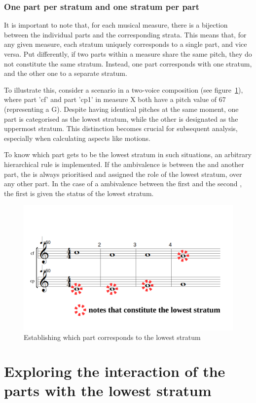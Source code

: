 \subsubsection{One part per stratum and one stratum per part} \label{subsubsection:one-part-per-stratum}
It is important to note that, for each musical measure, there is a bijection between the individual parts and the corresponding strata. This means that, for any given measure, each stratum uniquely corresponds to a single part, and vice versa. Put differently, if two parts within a measure share the same pitch, they do not constitute the same stratum. Instead, one part corresponds with one stratum, and the other one to a separate stratum.

To illustrate this, consider a scenario in a two-voice composition (see figure~\ref{fig:one-voice-max-can-be-a}), where part 'cf' and part 'cp1' in measure X both have a pitch value of 67 (representing a G). Despite having identical pitches at the same moment, one part is categorised as the lowest stratum, while the other is designated as the uppermost stratum. This distinction becomes crucial for subsequent analysis, especially when calculating aspects like motions.

To know which part gets to be the lowest stratum in such situations, an arbitrary hierarchical rule is implemented. If the ambivalence is between the \cfs and another part, the \cfs is always prioritised and assigned the role of the lowest stratum, over any other part. In the case of a ambivalence between the first \cp and the second \cp, the first \cps is given the status of the lowest stratum. 

\begin{figure}[h]
    \centering
    \includegraphics[width=.5\textwidth]{Images/one-voice-max-can-be-a.png}
    \caption{Establishing which part corresponds to the lowest stratum}
    \label{fig:one-voice-max-can-be-a}
  \end{figure}

\section{Exploring the interaction of the parts with the lowest stratum} \label{exploring-interaction-p-a}


